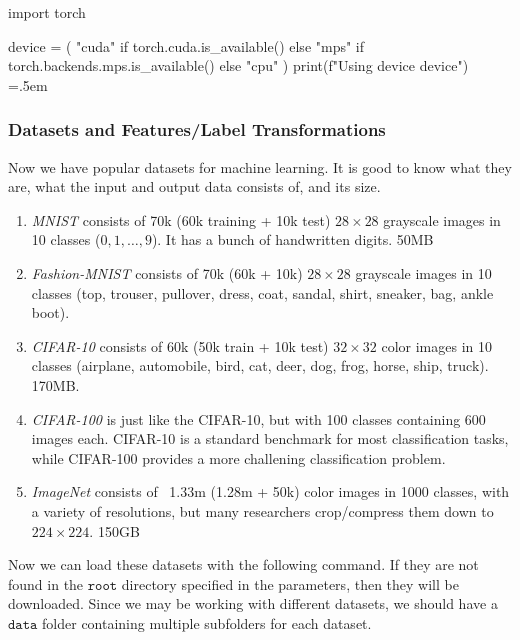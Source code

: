 \documentclass{article}
\newenvironment{cverbatim}
 {\SaveVerbatim{cverb}}
 {\endSaveVerbatim
  \flushleft\fboxrule=0pt\fboxsep=.5em
  \colorbox{cverbbg}{%
    \makebox[\dimexpr\linewidth-2\fboxsep][l]{\BUseVerbatim{cverb}}%
  }
  \endflushleft
}
\theoremstyle{definition}
\theoremstyle{remark}
\theoremstyle{definition}
\begin{document}
\begin{cverbatim}
import torch

device = (
    "cuda"
    if torch.cuda.is_available()
    else "mps"
    if torch.backends.mps.is_available()
    else "cpu"
)
print(f"Using {device} device")
\end{cverbatim}

\subsubsection{Datasets and Features/Label Transformations}

Now we have popular datasets for machine learning. It is good to know what they are, what the input and output data consists of, and its size. 
\begin{enumerate}
    \item \textit{MNIST} consists of 70k (60k training + 10k test) $28 \times 28$ grayscale images in 10 classes ($0, 1, \ldots, 9$). It has a bunch of handwritten digits. 50MB 

    \item \textit{Fashion-MNIST} consists of 70k (60k + 10k) $28 \times 28$ grayscale images in 10 classes (top, trouser, pullover, dress, coat, sandal, shirt, sneaker, bag, ankle boot). 

    \item \textit{CIFAR-10} consists of 60k (50k train + 10k test) $32 \times 32$ color images in 10 classes (airplane, automobile, bird, cat, deer, dog, frog, horse, ship, truck). 170MB. 

    \item \textit{CIFAR-100} is just like the CIFAR-10, but with 100 classes containing 600 images each. CIFAR-10 is a standard benchmark for most classification tasks, while CIFAR-100 provides a more challening classification problem. 

    \item \textit{ImageNet} consists of ~1.33m (1.28m + 50k) color images in 1000 classes, with a variety of resolutions, but many researchers crop/compress them down to $224 \times 224$. 150GB 
\end{enumerate}

Now we can load these datasets with the following command. If they are not found in the $\texttt{root}$ directory specified in the parameters, then they will be downloaded. Since we may be working with different datasets, we should have a $\texttt{data}$ folder containing multiple subfolders for each dataset. 
\end{document}
